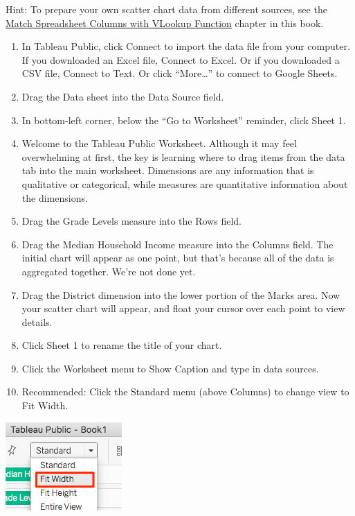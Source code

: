 \documentclass[
  english,
]{book}
\begin{document}
Hint: To prepare your own scatter chart data from different sources, see the \href{vlookup}{Match Spreadsheet Columns with VLookup Function} chapter in this book.

\begin{enumerate}
\def\labelenumi{\arabic{enumi})}
\setcounter{enumi}{3}
\item
  In Tableau Public, click Connect to import the data file from your computer. If you downloaded an Excel file, Connect to Excel. Or if you downloaded a CSV file, Connect to Text. Or click ``More\ldots{}'' to connect to Google Sheets.
\item
  Drag the Data sheet into the Data Source field.
\item
  In bottom-left corner, below the ``Go to Worksheet'' reminder, click Sheet 1.
\item
  Welcome to the Tableau Public Worksheet. Although it may feel overwhelming at first, the key is learning where to drag items from the data tab into the main worksheet. Dimensions are any information that is qualitative or categorical, while measures are quantitative information about the dimensions.
\item
  Drag the Grade Levels measure into the Rows field.
\item
  Drag the Median Household Income measure into the Columns field. The initial chart will appear as one point, but that's because all of the data is aggregated together. We're not done yet.
\item
  Drag the District dimension into the lower portion of the Marks area. Now your scatter chart will appear, and float your cursor over each point to view details.
\item
  Click Sheet 1 to rename the title of your chart.
\item
  Click the Worksheet menu to Show Caption and type in data sources.
\item
  Recommended: Click the Standard menu (above Columns) to change view to Fit Width.
\end{enumerate}

\includegraphics{images/05-chart/tableau-standard-fit-width.png}
\end{document}
